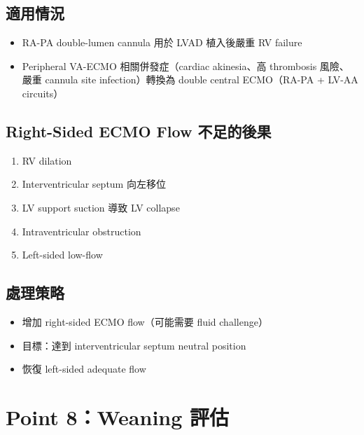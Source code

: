 \documentclass[12pt,a4paper]{article}
\begin{document}
\subsection{適用情況}

\begin{itemize}
    \item RA-PA double-lumen cannula 用於 LVAD 植入後嚴重 RV failure
    \item Peripheral VA-ECMO 相關併發症（cardiac akinesia、高 thrombosis 風險、嚴重 cannula site infection）轉換為 double central ECMO（RA-PA + LV-AA circuits）
\end{itemize}

\subsection{Right-Sided ECMO Flow 不足的後果}

\begin{enumerate}
    \item RV dilation
    \item Interventricular septum 向左移位
    \item LV support suction 導致 LV collapse
    \item Intraventricular obstruction
    \item Left-sided low-flow
\end{enumerate}

\subsection{處理策略}

\begin{itemize}
    \item 增加 right-sided ECMO flow（可能需要 fluid challenge）
    \item 目標：達到 interventricular septum neutral position
    \item 恢復 left-sided adequate flow
\end{itemize}

\section{Point 8：Weaning 評估}

\end{document}
